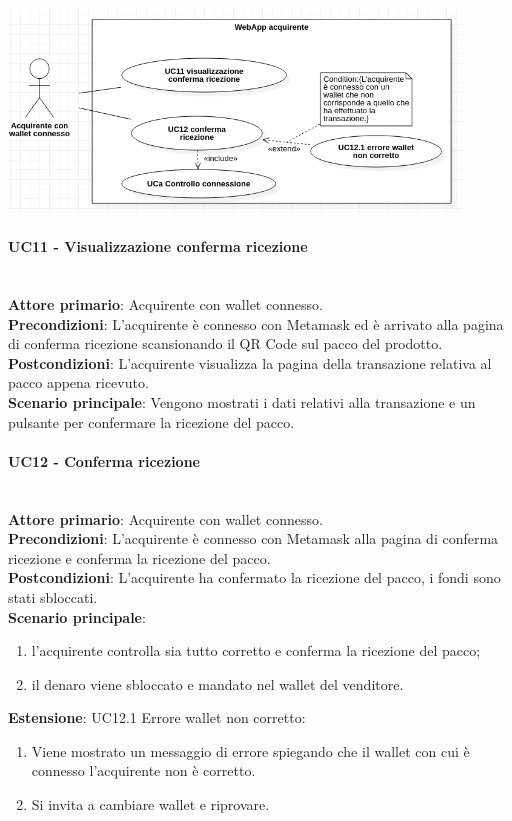 \documentclass[a4paper, 12pt]{article}
\begin{document}
\includegraphics[width=0.9\textwidth]{UC_WAA2}

\paragraph{UC11 - Visualizzazione conferma ricezione}\\
\textbf{Attore primario}: Acquirente con wallet connesso.\\
\textbf{Precondizioni}: L'acquirente è connesso con Metamask ed è arrivato alla pagina di conferma ricezione scansionando il QR Code sul pacco del prodotto.\\
\textbf{Postcondizioni}: L'acquirente visualizza la pagina della transazione relativa al pacco appena ricevuto.\\
\textbf{Scenario principale}:
Vengono mostrati i dati relativi alla transazione e un pulsante per confermare la ricezione del pacco.

\paragraph{UC12 - Conferma ricezione}\\
\textbf{Attore primario}: Acquirente con wallet connesso.\\
\textbf{Precondizioni}: L'acquirente è connesso con Metamask alla pagina di conferma ricezione e conferma la ricezione del pacco.\\
\textbf{Postcondizioni}: L'acquirente ha confermato la ricezione del pacco, i fondi sono stati sbloccati.\\
\textbf{Scenario principale}:
\begin{enumerate}
    \item l'acquirente controlla sia tutto corretto e conferma la ricezione del pacco;
    \item il denaro viene sbloccato e mandato nel wallet del venditore.
\end{enumerate}
\textbf{Estensione}:
UC12.1 Errore wallet non corretto:
\begin{enumerate}
    \item Viene mostrato un messaggio di errore spiegando che il wallet con cui è connesso l'acquirente non è corretto.
    \item Si invita a cambiare wallet e riprovare.
\end{enumerate}
\end{document}
